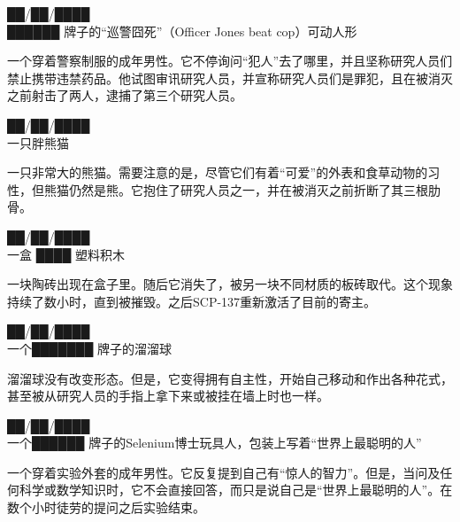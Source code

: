 \begin{scpbox}

██\slash ██\slash ████\\
██████ 牌子的“巡警囧死”（Officer Jones beat cop）可动人形

一个穿着警察制服的成年男性。它不停询问“犯人”去了哪里，并且坚称研究人员们禁止携带违禁药品。他试图审讯研究人员，并宣称研究人员们是罪犯，且在被消灭之前射击了两人，逮捕了第三个研究人员。

\end{scpbox}

\begin{scpbox}

██\slash ██\slash ████\\
一只胖熊猫

一只非常大的熊猫。需要注意的是，尽管它们有着“可爱”的外表和食草动物的习性，但熊猫仍然是熊。它抱住了研究人员之一，并在被消灭之前折断了其三根肋骨。

\end{scpbox}

\begin{scpbox}

██\slash ██\slash ████\\
一盒 ████ 塑料积木

一块陶砖出现在盒子里。随后它消失了，被另一块不同材质的板砖取代。这个现象持续了数小时，直到被摧毁。之后SCP-137重新激活了目前的寄主。

\end{scpbox}

\begin{scpbox}

██\slash ██\slash ████\\
一个███████ 牌子的溜溜球

溜溜球没有改变形态。但是，它变得拥有自主性，开始自己移动和作出各种花式，甚至被从研究人员的手指上拿下来或被挂在墙上时也一样。

\end{scpbox}

\begin{scpbox}

██\slash ██\slash ████\\
一个██████ 牌子的Selenium博士玩具人，包装上写着“世界上最聪明的人”

一个穿着实验外套的成年男性。它反复提到自己有“惊人的智力”。但是，当问及任何科学或数学知识时，它不会直接回答，而只是说自己是“世界上最聪明的人”。在数个小时徒劳的提问之后实验结束。

\end{scpbox}
